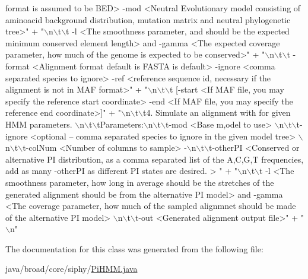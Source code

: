 \begin{DoxyCode}
{       format is assumed to be BED>  -mod <Neutral Evolutionary model consisting of aminoacid background
       distribution, mutation matrix and neutral phylogenetic tree>"} +
    \textcolor{stringliteral}{"\(\backslash\)n\(\backslash\)t\(\backslash\)t -l <The smoothness parameter, and should be the expected minimum conserved element length> and
       -gamma <The expected coverage parameter, how much of the genome is expected to be conserved>"} +
    \textcolor{stringliteral}{"\(\backslash\)n\(\backslash\)t\(\backslash\)t -format <Alignment format default is FASTA is default> -ignore <comma separated species to
       ignore> -ref <reference sequence id, necessary if the alignment is not in MAF format>"} +
    \textcolor{stringliteral}{"\(\backslash\)n\(\backslash\)t\(\backslash\)t  [-start <If MAF file, you may specify the reference start coordinate> -end <If MAF file, you
       may specify the reference end coordinate>]"} +
    \textcolor{stringliteral}{"\(\backslash\)n\(\backslash\)t\(\backslash\)t4. Simulate an alignment with for given HMM parameters. \(\backslash\)n\(\backslash\)t\(\backslash\)tParameters:\(\backslash\)n\(\backslash\)t\(\backslash\)t-mod <Base m,odel
       to use> \(\backslash\)n\(\backslash\)t\(\backslash\)t-ignore <optional -- comma separated species to ignore in the given model tree> \(\backslash\)n\(\backslash\)t\(\backslash\)t-colNum
       <Number of columns to sample> -\(\backslash\)n\(\backslash\)t\(\backslash\)t-otherPI <Conserved or alternative PI distribution, as a comma
       separated list of the A,C,G,T frequencies, add as many -otherPI as different PI states are desired. > "} +
    \textcolor{stringliteral}{"\(\backslash\)n\(\backslash\)t\(\backslash\)t -l <The smoothness parameter, how long in average should be the stretches of the generated
       alignment should be from the alternative PI model> and -gamma <The coverage parameter, how much of the sampled
       alignmnet should be made of the alternative PI model> \(\backslash\)n\(\backslash\)t\(\backslash\)t-out <Generated alignment output file>"} +
    \textcolor{stringliteral}{"\(\backslash\)n"}
\end{DoxyCode}


The documentation for this class was generated from the following file\+:\begin{DoxyCompactItemize}
\item 
java/broad/core/siphy/\hyperlink{_pi_h_m_m_8java}{Pi\+H\+M\+M.\+java}\end{DoxyCompactItemize}
